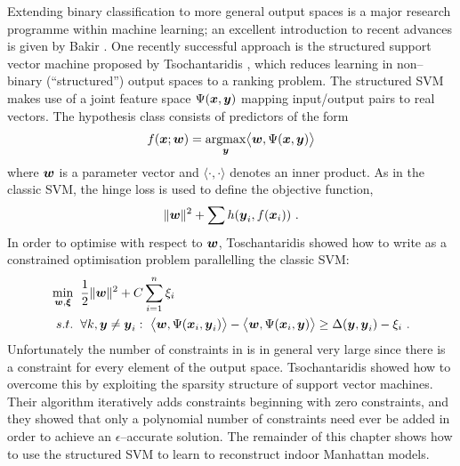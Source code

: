 Extending binary classification to more general output spaces is a
major research programme within machine learning; an excellent
introduction to recent advances is given by Bakir \etal
\cite{Bakir07}. One recently successful approach is the structured
support vector machine proposed by Tsochantaridis \etal
\cite{Tsochantaridis04}, which reduces learning in non--binary
(``structured'') output spaces to a ranking problem. The structured
SVM makes use of a joint feature space $\JointFtr(\inp,\outp)$ mapping
input/output pairs to real vectors. The hypothesis class consists of
predictors of the form
\begin{equation}
  \Predictor(\inp;\Model) 
  = 
  \argmax_{\outp}\limits 
  \bigl\langle \Model, \JointFtr(\inp,\outp) \bigr\rangle
  \label{eq:linear-max}
\end{equation}
where $\Model$ is a parameter vector and $\langle\cdot,\cdot\rangle$
denotes an inner product. As in the classic SVM, the hinge loss is
used to define the objective function,
\begin{equation}
  \label{eq:first-ssvm}
  \|\Model\|^2 + \sum h(\outp_i, \Predictor(\inp_i)) ~.
\end{equation}
In order to optimise with respect to $\Model$, Toschantaridis \etal
showed how to write  as a constrained optimisation
problem parallelling the classic SVM:
\begin{equation}
  \begin{split}
    \min_{\Model,\Slacks} &
      \hspace{2mm} 
    \frac{1}{2} \|\Model\|^2 +
      C \sum_{i=1}^n \Slack_i\\
    s.t. & \hspace{2mm} 
      \forall k, \outp \neq \outp_i:~
        \bigl\langle\Model, \JointFtr(\inp_i,\outp_i)\bigr\rangle -
        \bigl\langle\Model, \JointFtr(\inp_i,\outp)\bigr\rangle
      \geq
        \Loss(\outp,\outp_i) - \Slack_i ~.
  \end{split}
  \label{eq:ssvm}
\end{equation}
Unfortunately the number of constraints in  is in general
very large since there is a constraint for every element of the output
space. Tsochantaridis \etal \cite{Tsochantaridis04} showed how to
overcome this by exploiting the sparsity structure of support vector
machines. Their algorithm iteratively adds constraints beginning with
zero constraints, and they showed that only a polynomial number of
constraints need ever be added in order to achieve an
$\epsilon$--accurate solution. The remainder of this chapter shows how
to use the structured SVM to learn to reconstruct indoor Manhattan
models.


